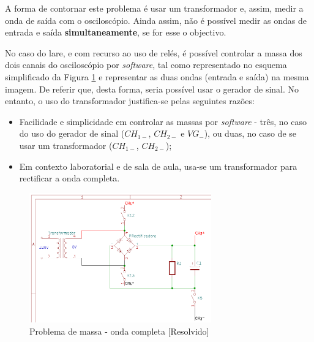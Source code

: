 A forma de contornar este problema é usar um transformador e, assim, medir a onda de saída com o osciloscópio. Ainda assim, não é possível medir as ondas de entrada e saída \textbf{simultaneamente}, se for esse o objectivo.

No caso do \acrshort{lare}, e com recurso ao uso de relés, é possível controlar a massa dos dois canais do osciloscópio por \textit{software}, tal como representado no esquema simplificado da Figura \ref{fig:ondacompleta-massa} e representar as duas ondas (entrada e saída) na mesma imagem. De referir que, desta forma, seria possível usar o gerador de sinal. No entanto, o uso do transformador justifica-se pelas seguintes razões:
\begin{itemize}
	\item Facilidade e simplicidade em controlar as massas por \textit{software} - três, no caso do uso do gerador de sinal ($CH_{1-}$, $CH_{2-}$ e $VG_{-}$), ou duas, no caso de se usar um transformador ($CH_{1-}$, $CH_{2-}$);
	\item Em contexto laboratorial e de sala de aula, usa-se um transformador para rectificar a onda completa.
\end{itemize}


\begin{figure}[hbtp]
	\centering
	\includegraphics[width=0.7\textwidth]{figures/sch-ondacompleta-massa.png}
	\caption{Problema de massa - onda completa [Resolvido]}
	\label{fig:ondacompleta-massa}
\end{figure}

